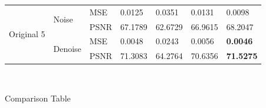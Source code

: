 \begin{center}
\begin{tabular}{llllllllllll|l|l|l|l|l|l|l|l|l|l|l|l|l|}
\multicolumn{4}{|l|}{\multirow{4}{*}{Original 5}} & \multicolumn{4}{l|}{\multirow{2}{*}{Noise}}   & \multicolumn{4}{l|}{MSE}  & \multicolumn{3}{l|}{0.0125}  & \multicolumn{3}{l|}{0.0351}  & \multicolumn{4}{l|}{0.0131}   & \multicolumn{3}{l|}{0.0098}           \\ \cline{9-25} 
\multicolumn{4}{|l|}{}                            & \multicolumn{4}{l|}{}                         & \multicolumn{4}{l|}{PSNR} & \multicolumn{3}{l|}{67.1789} & \multicolumn{3}{l|}{62.6729} & \multicolumn{4}{l|}{66.9615}  & \multicolumn{3}{l|}{68.2047}          \\ \cline{5-25} 
\multicolumn{4}{|l|}{}                            & \multicolumn{4}{l|}{\multirow{2}{*}{Denoise}} & \multicolumn{4}{l|}{MSE}  & \multicolumn{3}{l|}{0.0048}  & \multicolumn{3}{l|}{0.0243}  & \multicolumn{4}{l|}{0.0056}   & \multicolumn{3}{l|}{\textbf{0.0046}}  \\ \cline{9-25} 
\multicolumn{4}{|l|}{}                            & \multicolumn{4}{l|}{}                         & \multicolumn{4}{l|}{PSNR} & \multicolumn{3}{l|}{71.3083} & \multicolumn{3}{l|}{64.2764} & \multicolumn{4}{l|}{70.6356}  & \multicolumn{3}{l|}{\textbf{71.5275}} \\ \hline
\end{tabular}

\

Comparison Table
\end{center}









\newpage
